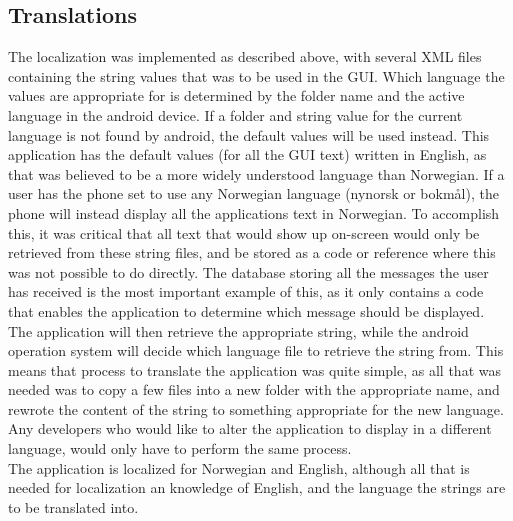 
\subsection{Translations}

The localization was implemented as described above, with several XML files containing the string values that was to be used in the GUI.  Which language the values are appropriate for is determined by the folder name and the active language in the android device. If a folder and string value for the current language is not found by android, the default values will be used instead. This application has the default values (for all the GUI text) written in English, as that was believed to be a more widely understood language than Norwegian. If a user has the phone set to use any Norwegian language (nynorsk or bokmål), the phone will instead display all the applications text in Norwegian. To accomplish this, it was critical that all text that would show up on-screen would only be retrieved from these string files, and be stored as a code or reference where this was not possible to do directly. The database storing all the messages the user has received is the most important example of this, as it only contains a code that enables the application to determine which message should be displayed. The application will then retrieve the appropriate string, while the android operation system will decide which language file to retrieve the string from. This means that process to translate the application was quite simple, as all that was needed was to copy a few files into a new folder with the appropriate name, and rewrote the content of the string to something appropriate for the new language. Any developers who would like to alter the application to display in a different language, would only have to perform the same process. \\
The application is localized for Norwegian and English, although all that is needed for localization an knowledge of English, and the language the strings are to be translated into. 
